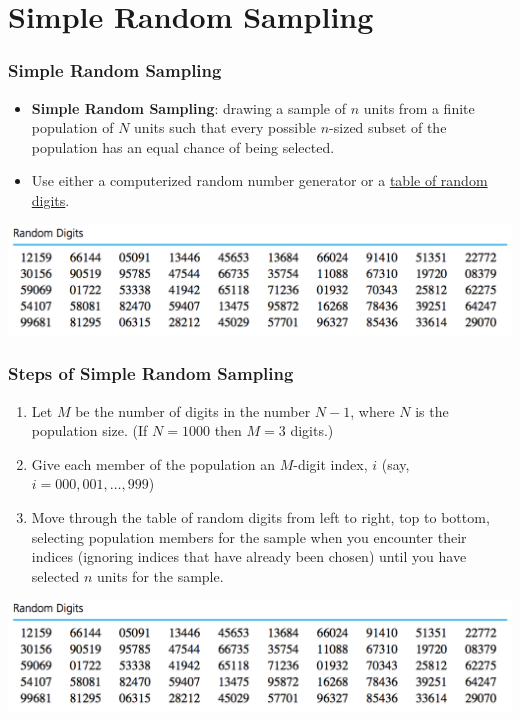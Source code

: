 \documentclass[handout]{beamer}
\numberwithin{equation}{section}
\begin{document}
\section{Simple Random Sampling}


\begin{frame}
\frametitle{Simple Random Sampling}
\begin{itemize}
\item {\bf Simple Random Sampling}: drawing a sample of $n$ units from a finite population of $N$ units such that every possible $n$-sized subset of the population has an equal chance of being selected.
\pause \item Use either a computerized random number generator or a \href{http://will-landau.com/stat305/tables/random-digits.pdf}{table of random digits}.
\end{itemize}

\begin{center}
 \includegraphics{../../fig/rdigits.png}
\end{center}

\end{frame}


\begin{frame}
\frametitle{Steps of Simple Random Sampling} \small

\begin{enumerate}[1. ]
\item Let $M$ be the number of digits in the number $N -1$, where $N$ is the population size. (If $N = 1000$ then $M = 3$ digits.)
\pause \item Give each member of the population an $M$-digit index, $i$ (say, $i = 000, 001, \ldots, 999$)
\pause \item Move through the table of random digits from left to right, top to bottom, selecting population members for the sample when you encounter their indices (ignoring indices that have already been chosen) until you have selected $n$ units for the sample.
\end{enumerate}

\begin{center}
 \includegraphics{../../fig/rdigits.png}
\end{center}
\end{frame}
\end{document}
